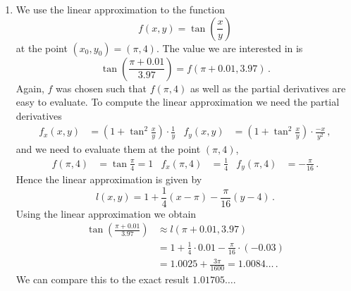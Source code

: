 \begin{solution}
\begin{enumerate}
\item
We use the linear approximation to the function
\[
f(x,y) = \tan \left( \frac {x}{y} \right)
\]
at the point $(x_0,y_0) = (\pi, 4)$. The value we are interested in is 
\[
\tan \left(\displaystyle\frac{\pi + 0.01}{3.97}\right) = f(\pi+0.01, 3.97)\,.
\]
Again, $f$ was chosen such that $f(\pi, 4)$ as well as the partial derivatives are easy to evaluate. To compute the linear approximation we need the partial derivatives
\begin{align*}
f_x(x,y) &= \left(1 + \tan^2\frac{x}{y}\right) \cdot \frac{1}{y} &
f_y(x,y) &= \left(1 + \tan^2\frac{x}{y}\right) \cdot \frac{-x}{y^2} \,,
\end{align*}
and we need to evaluate them at the point $(\pi, 4)$,
\begin{align*}
f(\pi, 4)&= \tan \frac \pi 4 = 1 &
f_x(\pi, 4) &=  \frac 14 &
f_y(\pi, 4) &= -\frac \pi{16}\,.
\end{align*}
Hence the linear approximation is given by
\[
l(x,y) = 1 + \frac 14 (x - \pi) - \frac \pi{16}(y-4)\,.
\]
Using the linear approximation we obtain
\begin{align*}
\tan \left(\displaystyle\frac{\pi + 0.01}{3.97}\right) &\approx l(\pi+0.01, 3.97)\\
&= 1+\frac 14 \cdot 0.01 - \frac \pi{16} \cdot (-0.03) \\
&= 1.0025 + \frac{3\pi}{1600} = 1.0084\dots\,.
\end{align*}
We can compare this to the exact result $1.01705\dots$.
\end{enumerate}
\end{solution}

